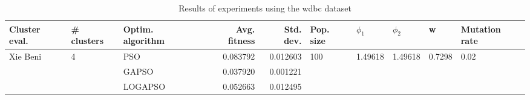 \begin{table}
\centering
\caption{Results of experiments using the wdbc dataset}
\begin{tabular}{lllrrlllll}
\toprule
            Cluster eval. &        \# clusters & Optim. algorithm &  Avg. fitness &  Std. dev. &            Pop. size &               $\phi_{1}$ &               $\phi_{2}$ &                       w &         Mutation rate \\
\midrule
\multirow{3}{*}{Xie Beni} & \multirow{3}{*}{4} &              PSO &      0.083792 &   0.012603 & \multirow{3}{*}{100} & \multirow{3}{*}{1.49618} & \multirow{3}{*}{1.49618} & \multirow{3}{*}{0.7298} & \multirow{3}{*}{0.02} \\
                          &                    &            GAPSO &      0.037920 &   0.001221 &                      &                          &                          &                         &                       \\
                          &                    &          LOGAPSO &      0.052663 &   0.012495 &                      &                          &                          &                         &                       \\
\bottomrule
\end{tabular}
\end{table}

